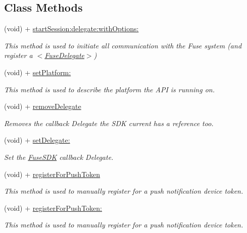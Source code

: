 \subsection*{Class Methods}
\begin{DoxyCompactItemize}
\item 
(void) + \hyperlink{interface_fuse_s_d_k_adf7ed64a02b9540c9ded4b931ea4e400}{start\+Session\+:delegate\+:with\+Options\+:}
\begin{DoxyCompactList}\small\item\em This method is used to initiate all communication with the Fuse system (and register a $<$\hyperlink{protocol_fuse_delegate-p}{Fuse\+Delegate}$>$) \end{DoxyCompactList}\item 
(void) + \hyperlink{interface_fuse_s_d_k_a4400b7bb4b8e108c38405c47eba69b5c}{set\+Platform\+:}
\begin{DoxyCompactList}\small\item\em This method is used to describe the platform the A\+P\+I is running on. \end{DoxyCompactList}\item 
(void) + \hyperlink{interface_fuse_s_d_k_aebd93d2d4e8a6d3029134a3656b003d5}{remove\+Delegate}
\begin{DoxyCompactList}\small\item\em Removes the callback Delegate the S\+D\+K current has a reference too. \end{DoxyCompactList}\item 
(void) + \hyperlink{interface_fuse_s_d_k_a46ad48419c53d45f417d9b0561061455}{set\+Delegate\+:}
\begin{DoxyCompactList}\small\item\em Set the \hyperlink{interface_fuse_s_d_k}{Fuse\+S\+D\+K} callback Delegate. \end{DoxyCompactList}\item 
(void) + \hyperlink{interface_fuse_s_d_k_aea1b9766935aafaeb49889dc6f7cca93}{register\+For\+Push\+Token}
\begin{DoxyCompactList}\small\item\em This method is used to manually register for a push notification device token. \end{DoxyCompactList}\item 
(void) + \hyperlink{interface_fuse_s_d_k_a774f0872e0eb00528391cdc376876446}{register\+For\+Push\+Token\+:}
\begin{DoxyCompactList}\small\item\em This method is used to manually register for a push notification device token. \end{DoxyCompactList}\item 

\end{DoxyCompactItemize}
